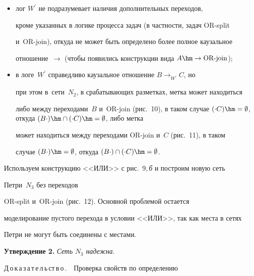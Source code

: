   \begin{itemize}

  \item лог $W^\prime$ не подразумевает наличия дополнительных переходов, 

кроме указанных в логике процесса задач (в частности, задач {OR-split} 

и~{OR-join}), откуда не может быть определено более полное каузальное 

отношение~$\to$ (чтобы появились конструкции вида $A\hm\to \mbox{{OR-join}}$);

  \item в логе~$W^\prime$ справедливо каузальное отношение $B\to_{W^\prime} C$,  но 

при этом в~сети~$N_2$, в срабатывающих разметках, метка может находиться 

либо между переходами~$B$ и~{OR-join} (рис.~10), в таком случае $(\cdot 

C)\hm=\emptyset$, откуда $(B\cdot)\hm\cap (\cdot C)\hm= \emptyset$, либо метка 

может находиться между переходами {OR-join} и~$C$ (рис.~11), в таком 

случае $(B\cdot)\hm=\emptyset$, откуда $(B\cdot )\cap (\cdot C)\hm=\emptyset$.

\end{itemize}



  

  Используем конструкцию <<ИЛИ>> с рис.~9,\,\textit{б} и построим новую сеть 

Петри~$N_3$ без переходов 

 {OR-split} и~{OR-join} (рис.~12). Основной проблемой остается 

моделирование пустого перехода в условии <<ИЛИ>>, так как места в сетях 

Петри не могут быть соединены с местами.






\pagebreak

  

  \noindent

  \textbf{Утверждение 2.} \textit{Сеть $N_3$ надежна}.

  

  \smallskip

  

  \noindent

  Д\,о\,к\,а\,з\,а\,т\,е\,л\,ь\,ст\,в\,о\,.\ \ Проверка свойств по определению 

